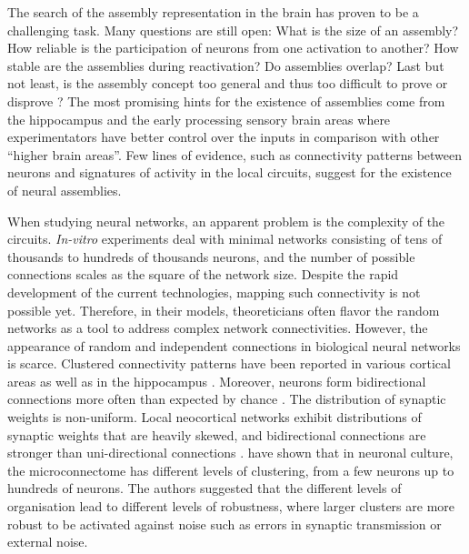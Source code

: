     The search of the assembly representation in the brain has proven to be a
    challenging task. Many questions are still open: What is the size of
    an assembly? How reliable is the participation of neurons from one
    activation to another? How stable are the assemblies during reactivation?
    Do assemblies overlap? Last but not least, is the assembly concept too
    general and thus too difficult to prove or disprove \citep{Wallace2010}?
    The most promising hints for the existence of assemblies come from the
    hippocampus and the early processing sensory brain areas where
    experimentators have better control over the inputs in comparison with
    other ``higher brain areas''. Few lines of evidence, such as connectivity
    patterns between neurons and signatures of activity in the local circuits,
    suggest for the existence of neural assemblies.
    

    When studying neural networks, an apparent problem is the complexity of the
    circuits. {\it In-vitro} experiments deal with minimal networks consisting
    of tens of thousands to hundreds of thousands neurons, and the number of
    possible connections scales as the square of the network size. Despite the
    rapid development of the current technologies, mapping such connectivity is
    not possible yet. Therefore, in their models, theoreticians often flavor the
    random networks as a tool to address complex network connectivities.
    However, the appearance of random and independent connections in biological
    neural networks is scarce. Clustered connectivity patterns have been
    reported in various cortical areas \citep{Song2005, Ko2011, Perin2011,
    Shimono2015} as well as in the hippocampus \citep{Takahashi2010,
    Guzman2016}. Moreover, neurons form bidirectional connections more often
    than expected by chance \citep{Markram1997, Song2005, Takahashi2010,
    Ko2011, Perin2011}. The distribution of synaptic weights is non-uniform.
    Local neocortical networks exhibit distributions of synaptic weights that
    are heavily skewed, and bidirectional connections are stronger than
    uni-directional connections \citep{Markram1997, Song2005, Buzsaki2014}.
    \cite{Shimono2015} have shown that in neuronal culture, the microconnectome
    has different levels of clustering, from a few neurons up to hundreds of
    neurons. The authors suggested that the different levels of organisation
    lead to different levels of robustness, where larger clusters are more
    robust to be activated against noise such as errors in synaptic
    transmission or external noise.

